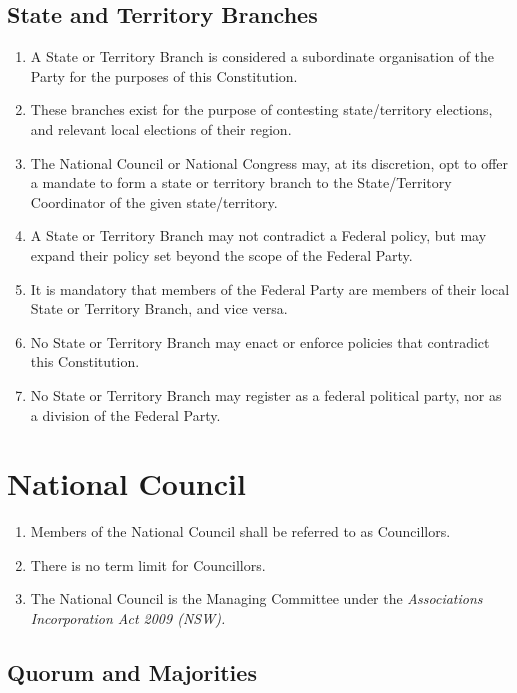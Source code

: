 \documentclass[a4paper,titlepage,8.5pt]{article}
\begin{document}
\subsection{State and Territory Branches}

\begin{enumerate}
\item A State or Territory Branch is considered a subordinate organisation of the Party for the purposes of this Constitution.
\item These branches exist for the purpose of contesting state/territory elections, and relevant local elections of their region.
\item The National Council or National Congress may, at its discretion, opt to offer a mandate to form a state or territory branch to the State/Territory Coordinator of the given state/territory.
\item A State or Territory Branch may not contradict a Federal policy, but may expand their policy set beyond the scope of the Federal Party.
\item It is mandatory that members of the Federal Party are members of their local State or Territory Branch, and vice versa.
\item No State or Territory Branch may enact or enforce policies that contradict this Constitution.
\item No State or Territory Branch may register as a federal political party, nor as a division of the Federal Party.
\end{enumerate}

\section{National Council}

\begin{enumerate}
\item Members of the National Council shall be referred to as Councillors.
\item There is no term limit for Councillors.
\item The National Council is the Managing Committee under the \textit{Associations Incorporation Act 2009 (NSW).}
\end{enumerate}

\subsection{Quorum and Majorities}
\end{document}
